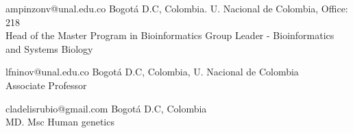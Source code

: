 

{ampinzonv@unal.edu.co}
{Bogotá D.C, Colombia. U. Nacional de Colombia, Office: 218}
 \\
Head of the Master Program in Bioinformatics
Group Leader - Bioinformatics and Systems Biology 
\\
\divider

{lfninov@unal.edu.co}
{Bogotá D.C, Colombia, U. Nacional de Colombia}
 \\
Associate Professor
\\
\divider

{cladelisrubio@gmail.com}
{Bogotá D.C, Colombia}
 \\
MD. Msc Human genetics
\\
\divider


